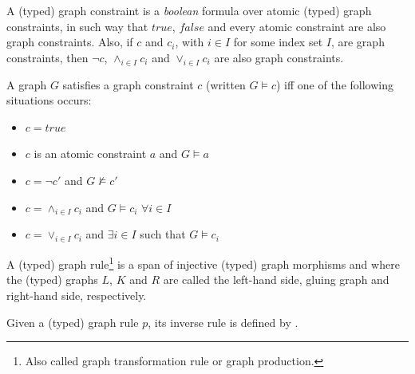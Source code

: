 \begin{definition} A (typed) graph constraint is a \emph{boolean} formula over atomic (typed) graph constraints, in such way that $true$, $false$ and every atomic constraint are also graph constraints. Also, if $c$ and $c_i$, with $i \in I$ for some index set $I$, are graph constraints, then $\neg c$, $\land_{i \in I} c_i$ and $\lor_{i \in I} c_i$ are also graph constraints.

  A graph $G$ satisfies a graph constraint $c$ (written $G \models c$) iff one of the following situations occurs:
  \begin{itemize}
    \item $c = true$
    \item $c$ is an atomic constraint $a$ and $G \models a$
    \item $c = \neg c'$ and $G \not\models c'$
    \item $c = \land_{i \in I}c_i$ and $G \models c_i$ $\forall i \in I$ 
    \item $c = \lor_{i \in I}c_i$  and $\exists i \in I$ such that $G \models c_i$
  \end{itemize}
\end{definition}

\begin{example}
\end{example}

\begin{definition}\label{def:graph-rule} A (typed) graph rule\footnote{Also called graph transformation rule or graph production.} \graphrule{} is a span of injective (typed) graph morphisms \lefthand{} and \righthand{}  where the (typed) graphs $L$, $K$ and $R$ are called the left-hand side, gluing graph and right-hand side, respectively.

  Given a (typed) graph rule $p$, its inverse rule is defined by \inversegraphrule.
\end{definition}


